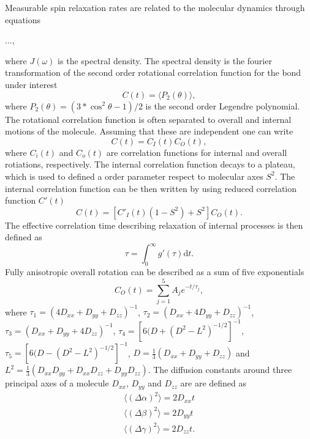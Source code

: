 \documentclass[pre,aps,floatfix,authordate1-4]{revtex4-1}
\begin{document}
Measurable spin relaxation rates are related to the molecular dynamics through
equations

...,

where $J(\omega)$ is the spectral density. The spectral density is the
fourier transformation of the second order rotational correlation function
for the bond under interest
\begin{equation}
  C(t)=\langle P_2(\theta) \rangle,
\end{equation}
where $P_2(\theta)=(3*\cos^2\theta-1)/2$ is the second order Legendre polynomial.
The rotational correlation function is often separated to overall and internal
motions of the molecule. Assuming that these are independent one can write
\begin{equation}
  C(t)=C_I(t)C_O(t),
\end{equation}
where $C_i(t)$ and $C_o(t)$ are correlation functions for internal and overall
rotiations, respectively. The internal correlation function decays to a plateau, which
is used to defined a order parameter respect to molecular axes $S^2$.
The internal correlation function can be then written by using
reduced correlation function $C'(t)$
\begin{equation}
  C(t)=[C'_I(t)(1-S^2)+S^2]C_O(t).
\end{equation}
The effective correlation time describing relaxation of internal
processes is then defined as
\begin{equation}
  \tau=\int_0^\infty g'(\tau) \mathrm{d}t.
\end{equation}
Fully anisotropic overall rotation can be described as a sum of five exponentials
\begin{equation}
  C_O(t)=\sum_{j=1}^5 A_j e^{-t/\tau_j},
\end{equation}
where
$\tau_1=(4D_{xx}+D_{yy}+D_{zz})^{-1}$,
$\tau_2=(D_{xx}+4D_{yy}+D_{zz})^{-1}$,
$\tau_3=(D_{xx}+D_{yy}+4D_{zz})^{-1}$,
$\tau_4=[6(D+(D^2-L^2)^{-1/2}]^{-1}$,
$\tau_5=[6(D-(D^2-L^2)^{-1/2}]^{-1}$,
$D=\frac{1}{3}(D_{xx}+D_{yy}+D_{zz})$ and 
$L^2=\frac{1}{3}(D_{xx}D_{yy}+D_{xx}D_{zz}+D_{yy}D_{zz})$.
The diffusion constants around
three principal axes of a molecule
$D_{xx}$, $D_{yy}$ and $D_{zz}$ are 
are defined as 
\begin{equation}
\begin{aligned}
  \langle (\Delta \alpha)^2 \rangle = 2 D_{xx} t \\
  \langle (\Delta \beta)^2 \rangle = 2 D_{yy} t \\
  \langle (\Delta \gamma)^2 \rangle = 2 D_{zz} t. \\
\end{aligned}
\end{equation}
\end{document}
